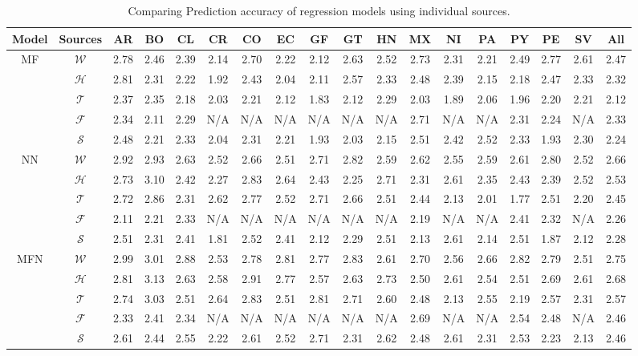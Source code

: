 \begin{table}[tb!]
\centering
\caption{\label{tb:comparison_single}  Comparing Prediction accuracy of regression models using individual sources.}
\vspace{1em}
\footnotesize
\begin{tabular}{|*{18}{c|}}
\hline
Model               & Sources       & AR & BO & CL & CR & CO & EC & GF & GT & HN & MX & NI & PA & PY & PE & SV & All\\
\hline \hline
\multirow{5}{*}{MF} & $\mathcal{W}$ &2.78&2.46&2.39&2.14&2.70&2.22&2.12&2.63&2.52&2.73&2.31&2.21&2.49&2.77&2.61&2.47\\ 
                    & $\mathcal{H}$ &2.81&2.31&2.22&1.92&2.43&2.04&2.11&2.57&2.33&2.48&2.39&2.15&2.18&2.47&2.33&2.32\\ 
                    & $\mathcal{T}$ &2.37&2.35&2.18&2.03&2.21&2.12&1.83&2.12&2.29&2.03&1.89&2.06&1.96&2.20&2.21&2.12\\ 
                    & $\mathcal{F}$ &2.34&2.11&2.29& N/A& N/A& N/A& N/A& N/A& N/A&2.71& N/A& N/A&2.31&2.24& N/A&2.33\\ 
                    & $\mathcal{S}$ &2.48&2.21&2.33&2.04&2.31&2.21&1.93&2.03&2.15&2.51&2.42&2.52&2.33&1.93&2.30&2.24 \\ 
\hline
\multirow{5}{*}{NN} & $\mathcal{W}$ &2.92&2.93&2.63&2.52&2.66&2.51&2.71&2.82&2.59&2.62&2.55&2.59&2.61&2.80&2.52&2.66\\ 
                    & $\mathcal{H}$ &2.73&3.10&2.42&2.27&2.83&2.64&2.43&2.25&2.71&2.31&2.61&2.35&2.43&2.39&2.52&2.53\\ 
                    & $\mathcal{T}$ &2.72&2.86&2.31&2.62&2.77&2.52&2.71&2.66&2.51&2.44&2.13&2.01&1.77&2.51&2.20&2.45\\ 
                    & $\mathcal{F}$ &2.11&2.21&2.33& N/A& N/A& N/A& N/A& N/A& N/A&2.19& N/A& N/A&2.41&2.32& N/A&2.26\\ 
                    & $\mathcal{S}$ &2.51&2.31&2.41&1.81&2.52&2.41&2.12&2.29&2.51&2.13&2.61&2.14&2.51&1.87&2.12&2.28 \\ 
\hline
\multirow{5}{*}{MFN}& $\mathcal{W}$ &2.99&3.01&2.88&2.53&2.78&2.81&2.77&2.83&2.61&2.70&2.56&2.66&2.82&2.79&2.51&2.75\\ 
                    & $\mathcal{H}$ &2.81&3.13&2.63&2.58&2.91&2.77&2.57&2.63&2.73&2.50&2.61&2.54&2.51&2.69&2.61&2.68\\ 
                    & $\mathcal{T}$ &2.74&3.03&2.51&2.64&2.83&2.51&2.81&2.71&2.60&2.48&2.13&2.55&2.19&2.57&2.31&2.57\\ 
                    & $\mathcal{F}$ &2.33&2.41&2.34& N/A& N/A& N/A& N/A& N/A& N/A&2.69& N/A& N/A&2.54&2.48& N/A&2.46\\ 
                    & $\mathcal{S}$ &2.61&2.44&2.55&2.22&2.61&2.52&2.71&2.31&2.62&2.48&2.61&2.31&2.53&2.23&2.13&2.46\\ 
\hline
\end{tabular}
\end{table}



